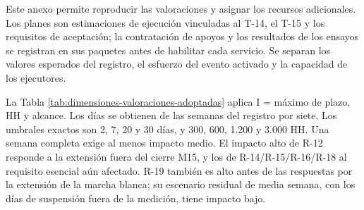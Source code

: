 \documentclass[anexo]{../../comun/overfore}
\begin{document}
\begin{horizontal}

Este anexo permite reproducir las valoraciones y asignar los recursos adicionales. Los planes son estimaciones de ejecución vinculadas al T-14, el T-15 y los requisitos de aceptación; la contratación de apoyos y los resultados de los ensayos se registran en sus paquetes antes de habilitar cada servicio. Se separan los valores esperados del registro, el esfuerzo del evento activado y la capacidad de los ejecutores.

La Tabla \ref{tab:dimensiones-valoraciones-adoptadas} aplica I = máximo de plazo, HH y alcance. Los días se obtienen de las semanas del registro por siete. Los umbrales exactos son 2, 7, 20 y 30 días, y 300, 600, 1.200 y 3.000 HH. Una semana completa exige al menos impacto medio. El impacto alto de R-12 responde a la extensión fuera del cierre M15, y los de R-14/R-15/R-16/R-18 al requisito esencial aún afectado. R-19 también es alto antes de las respuestas por la extensión de la marcha blanca; su escenario residual de media semana, con los días de suspensión fuera de la medición, tiene impacto bajo.


\end{horizontal}
\end{document}
